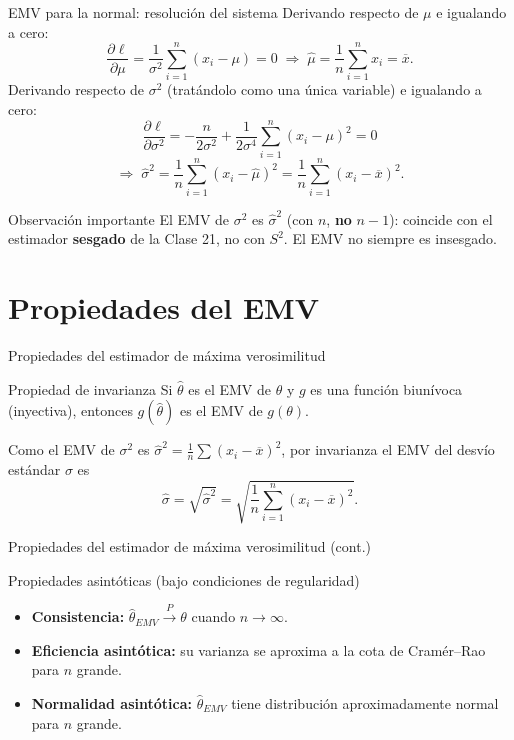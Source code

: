 \documentclass[aspectratio=169,11pt]{beamer}
\begin{document}
\begin{frame}{EMV para la normal: resolución del sistema}
Derivando respecto de $\mu$ e igualando a cero:
\[
\frac{\partial \ell}{\partial \mu} = \frac{1}{\sigma^2}\sum_{i=1}^n (x_i-\mu) = 0 \;\Longrightarrow\; \widehat\mu = \frac{1}{n}\sum_{i=1}^n x_i = \overline x.
\]
Derivando respecto de $\sigma^2$ (tratándolo como una única variable) e igualando a cero:
\[
\frac{\partial \ell}{\partial \sigma^2} = -\frac{n}{2\sigma^2} + \frac{1}{2\sigma^4}\sum_{i=1}^n (x_i-\mu)^2 = 0
\]
\[
\Longrightarrow \; \widehat\sigma^2 = \frac{1}{n}\sum_{i=1}^n (x_i-\widehat\mu)^2 = \frac{1}{n}\sum_{i=1}^n (x_i-\overline x)^2.
\]
\begin{alertblock}{Observación importante}
El EMV de $\sigma^2$ es $\widehat\sigma^2$ (con $n$, \textbf{no} $n-1$): coincide con el estimador \textbf{sesgado} de la Clase 21, no con $S^2$. El EMV no siempre es insesgado.
\end{alertblock}
\end{frame}

\section{Propiedades del EMV}

\begin{frame}{Propiedades del estimador de máxima verosimilitud}
\begin{block}{Propiedad de invarianza}
Si $\widehat\theta$ es el EMV de $\theta$ y $g$ es una función biunívoca (inyectiva), entonces $g(\widehat\theta)$ es el EMV de $g(\theta)$.
\end{block}
\begin{example}
Como el EMV de $\sigma^2$ es $\widehat\sigma^2 = \frac{1}{n}\sum(x_i-\overline x)^2$, por invarianza el EMV del desvío estándar $\sigma$ es
\[
\widehat\sigma = \sqrt{\widehat\sigma^2} = \sqrt{\frac{1}{n}\sum_{i=1}^n (x_i-\overline x)^2}.
\]
\end{example}

\end{frame}

\begin{frame}{Propiedades del estimador de máxima verosimilitud (cont.)}
\begin{block}{Propiedades asintóticas (bajo condiciones de regularidad)}
\begin{itemize}
\item \textbf{Consistencia:} $\widehat\theta_{EMV} \xrightarrow{P} \theta$ cuando $n\to\infty$.
\item \textbf{Eficiencia asintótica:} su varianza se aproxima a la cota de Cramér--Rao para $n$ grande.
\item \textbf{Normalidad asintótica:} $\widehat\theta_{EMV}$ tiene distribución aproximadamente normal para $n$ grande.
\end{itemize}
\end{block}
\end{frame}
\end{document}
